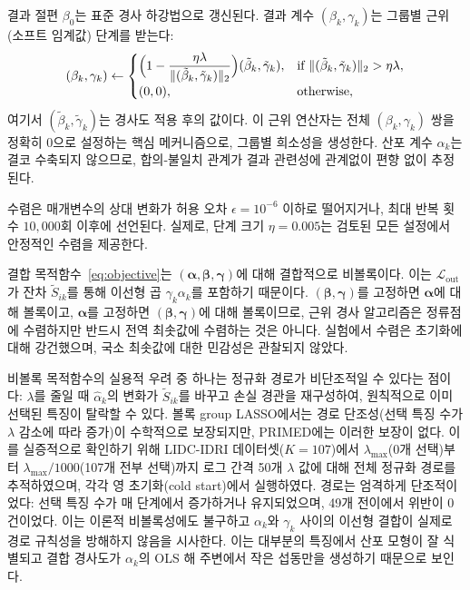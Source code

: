 \documentclass[a4paper,11pt]{article}
\begin{document}
결과 절편 $\beta_0$는 표준 경사 하강법으로 갱신된다.
결과 계수 $(\beta_k, \gamma_k)$는 그룹별 근위(소프트 임계값) 단계를 받는다:
\[
  (\beta_k, \gamma_k) \leftarrow
  \begin{cases}
    \displaystyle \Bigl(1 - \frac{\eta\lambda}{\|(\tilde\beta_k, \tilde\gamma_k)\|_2}\Bigr)
    (\tilde\beta_k, \tilde\gamma_k),
    & \text{if } \|(\tilde\beta_k, \tilde\gamma_k)\|_2 > \eta\lambda, \\[6pt]
    (0,0), & \text{otherwise},
  \end{cases}
\]
여기서 $(\tilde\beta_k, \tilde\gamma_k)$는 경사도 적용 후의 값이다.
이 근위 연산자는 전체 $(\beta_k, \gamma_k)$ 쌍을 정확히 0으로 설정하는 핵심 메커니즘으로, 그룹별 희소성을 생성한다.
산포 계수 $\alpha_k$는 결코 수축되지 않으므로, 합의-불일치 관계가 결과 관련성에 관계없이 편향 없이 추정된다.

수렴은 매개변수의 상대 변화가 허용 오차 $\epsilon = 10^{-6}$ 이하로 떨어지거나, 최대 반복 횟수 $10{,}000$회 이후에 선언된다.
실제로, 단계 크기 $\eta = 0.005$는 검토된 모든 설정에서 안정적인 수렴을 제공한다.

결합 목적함수~\eqref{eq:objective}는 $(\boldsymbol{\alpha}, \boldsymbol{\beta}, \boldsymbol{\gamma})$에 대해 결합적으로 비볼록이다. 이는 $\mathcal{L}_{\mathrm{out}}$가 잔차 $\tilde S_{ik}$를 통해 이선형 곱 $\gamma_k \alpha_k$를 포함하기 때문이다.
$(\boldsymbol{\beta}, \boldsymbol{\gamma})$를 고정하면 $\boldsymbol{\alpha}$에 대해 볼록이고, $\boldsymbol{\alpha}$를 고정하면 $(\boldsymbol{\beta}, \boldsymbol{\gamma})$에 대해 볼록이므로, 근위 경사 알고리즘은 정류점에 수렴하지만 반드시 전역 최솟값에 수렴하는 것은 아니다.
실험에서 수렴은 초기화에 대해 강건했으며, 국소 최솟값에 대한 민감성은 관찰되지 않았다.

비볼록 목적함수의 실용적 우려 중 하나는 정규화 경로가 비단조적일 수 있다는 점이다: $\lambda$를 줄일 때 $\hat\alpha_k$의 변화가 $\tilde S_{ik}$를 바꾸고 손실 경관을 재구성하여, 원칙적으로 이미 선택된 특징이 탈락할 수 있다.
볼록 group LASSO에서는 경로 단조성(선택 특징 수가 $\lambda$ 감소에 따라 증가)이 수학적으로 보장되지만, PRIMED에는 이러한 보장이 없다.
이를 실증적으로 확인하기 위해 LIDC-IDRI 데이터셋($K = 107$)에서 $\lambda_{\max}$(0개 선택)부터 $\lambda_{\max}/1000$(107개 전부 선택)까지 로그 간격 50개 $\lambda$ 값에 대해 전체 정규화 경로를 추적하였으며, 각각 영 초기화(cold start)에서 실행하였다.
경로는 엄격하게 단조적이었다: 선택 특징 수가 매 단계에서 증가하거나 유지되었으며, 49개 전이에서 위반이 0건이었다.
이는 이론적 비볼록성에도 불구하고 $\alpha_k$와 $\gamma_k$ 사이의 이선형 결합이 실제로 경로 규칙성을 방해하지 않음을 시사한다. 이는 대부분의 특징에서 산포 모형이 잘 식별되고 결합 경사도가 $\alpha_k$의 OLS 해 주변에서 작은 섭동만을 생성하기 때문으로 보인다.
\end{document}
